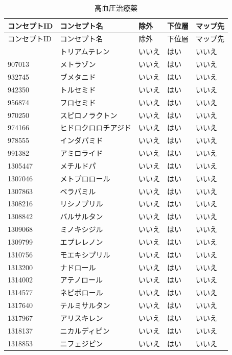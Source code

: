 \documentclass[
  11pt]{book}
\theoremstyle{definition}
\theoremstyle{definition}
\theoremstyle{definition}
\theoremstyle{definition}
\theoremstyle{remark}
\begin{document}
\begin{longtable}[]{@{}lllll@{}}
\caption{\label{tab:htnDrugsThzMono} 高血圧治療薬}\tabularnewline
\toprule\noalign{}
コンセプトID & コンセプト名 & 除外 & 下位層 & マップ先 \\
\midrule\noalign{}
\endfirsthead
\toprule\noalign{}
コンセプトID & コンセプト名 & 除外 & 下位層 & マップ先 \\
\midrule\noalign{}
\endhead
\bottomrule\noalign{}
\endlastfoot
904542 & トリアムテレン & いいえ & はい & いいえ \\
907013 & メトラゾン & いいえ & はい & いいえ \\
932745 & ブメタニド & いいえ & はい & いいえ \\
942350 & トルセミド & いいえ & はい & いいえ \\
956874 & フロセミド & いいえ & はい & いいえ \\
970250 & スピロノラクトン & いいえ & はい & いいえ \\
974166 & ヒドロクロロチアジド & いいえ & はい & いいえ \\
978555 & インダパミド & いいえ & はい & いいえ \\
991382 & アミロライド & いいえ & はい & いいえ \\
1305447 & メチルドパ & いいえ & はい & いいえ \\
1307046 & メトプロロール & いいえ & はい & いいえ \\
1307863 & ベラパミル & いいえ & はい & いいえ \\
1308216 & リシノプリル & いいえ & はい & いいえ \\
1308842 & バルサルタン & いいえ & はい & いいえ \\
1309068 & ミノキシジル & いいえ & はい & いいえ \\
1309799 & エプレレノン & いいえ & はい & いいえ \\
1310756 & モエキシプリル & いいえ & はい & いいえ \\
1313200 & ナドロール & いいえ & はい & いいえ \\
1314002 & アテノロール & いいえ & はい & いいえ \\
1314577 & ネビボロール & いいえ & はい & いいえ \\
1317640 & テルミサルタン & いいえ & はい & いいえ \\
1317967 & アリスキレン & いいえ & はい & いいえ \\
1318137 & ニカルディピン & いいえ & はい & いいえ \\
1318853 & ニフェジピン & いいえ & はい & いいえ \\

\end{longtable}
\end{document}
